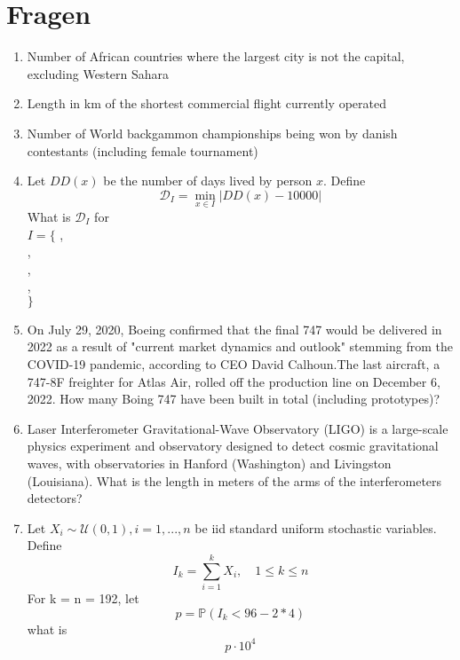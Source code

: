 \documentclass[12pt,a4paper]{article}
\begin{document}
\section*{Fragen}
\begin{enumerate}


\item Number of African countries where the largest city is not the capital, excluding Western Sahara

\item Length in km of the shortest commercial flight currently operated

\item Number of World backgammon championships being won by danish contestants (including female tournament)

\item Let $DD(x)$ be the number of days lived by person $x$. 
Define $$ \mathcal{D}_I =  \min_{x \in I} | DD(x) - 10000 | $$
What is 
$\mathcal{D}_I$ for \\
$I = \{$
, \\
, \\
, \\
, \\ 
$\}$


\item On July 29, 2020, Boeing confirmed that the final 747 would be delivered in 2022 as a result of "current market dynamics and outlook" stemming from the COVID-19 pandemic, according to CEO David Calhoun.The last aircraft, a 747-8F freighter for Atlas Air, rolled off the production line on December 6, 2022. How many Boing 747 have been built in total (including prototypes)?

\item Laser Interferometer Gravitational-Wave Observatory (LIGO) is a large-scale physics experiment and observatory designed to detect cosmic gravitational waves, with observatories in Hanford (Washington) and Livingston (Louisiana). What is the length in meters of the arms of the interferometers detectors?

  
\item Let $X_i \sim \mathcal{U}(0,1), i = 1,...,n$ be iid standard uniform stochastic variables. 
Define $$ I_k = \sum_{i = 1}^k X_i, \quad 1 \leq k \leq n $$
For k = n = 192, let 
$$
p = \mathbb{P}\left( I_k < 96 - 2*4 \right)
$$
what is $$p\cdot 10^4$$

  

\end{enumerate}
\end{document}
